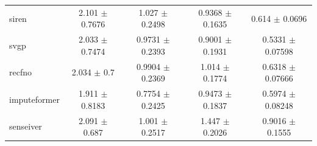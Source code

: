 \documentclass[letterpaper,9pt]{article}
\begin{document}
\begin{table}[htbp]
{\begin{tabular}{lcccc}
siren 
& 2.101 $\pm$ 0.7676
& 1.027 $\pm$ 0.2498
& 0.9368 $\pm$ 0.1635
& 0.614 $\pm$ 0.0696 \\

svgp 
& 2.033 $\pm$ 0.7474
& 0.9731 $\pm$ 0.2393
& 0.9001 $\pm$ 0.1931
& 0.5331 $\pm$ 0.07598 \\

recfno 
& 2.034 $\pm$ 0.7
& 0.9904 $\pm$ 0.2369
& 1.014 $\pm$ 0.1774
& 0.6318 $\pm$ 0.07666 \\

imputeformer 
& 1.911 $\pm$ 0.8183
& 0.7754 $\pm$ 0.2425
& 0.9473 $\pm$ 0.1837
& 0.5974 $\pm$ 0.08248 \\

senseiver 
& 2.091 $\pm$ 0.687
& 1.001 $\pm$ 0.2517
& 1.447 $\pm$ 0.2026
& 0.9016 $\pm$ 0.1555 \\

\hline
\end{tabular}%
}
\end{table}



\begin{table}[htbp]
\centering
\caption{Sparse evaluation results for govpol. Common settings: dataset=govpol; obs=U\_sensor; mask=U\_sensor\_mask; sparse n=64690; bootstrap samples=1000; bootstrap seed=123. Results are reported as mean $\pm$ std.}
\label{tab:sparse-govpol}
\end{table}
\end{document}

